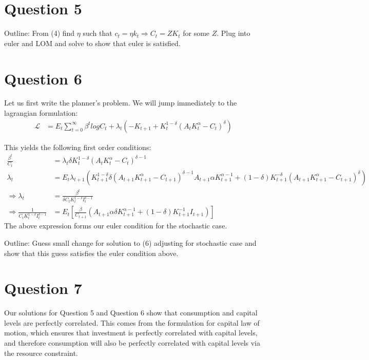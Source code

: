 \documentclass[11pt]{article} %
\begin{document}
\section{Question 5}
Outline: From (4) find $\eta$ such that $c_t = \eta k_t \Rightarrow C_t = ZK_t$ for some $Z$. Plug into euler and LOM and solve to show that euler is satisfied.
\section{Question 6}
Let us first write the planner's problem. We will jump immediately to the lagrangian formulation:
\begin{align*}
\mathcal{L} &= E_t\sum_{t=0}^{\infty} \beta^t log C_t + \lambda_t\left(-K_{t+1}+ K_t^{1-\delta}\left( A_tK_t^{\alpha}  - C_t \right)^{\delta}\right)
\end{align*}

This yields the following first order conditions:
\begin{align*}
\frac{\beta^t}{C_t} &= \lambda_t \delta K_t^{1-\delta}(A_tK_t^{\alpha}  - C_t )^{\delta - 1}\\
\lambda_t &= E_t\lambda_{t+1}(K_{t+1}^{1-\delta}\delta(A_{t+1}K_{t+1}^{\alpha}  - C_{t+1} )^{\delta - 1}A_{t+1}\alpha K_{t+1}^{\alpha - 1} + (1-\delta)K_{t+1}^{-\delta} \left( A_{t+1}K_{t+1}^{\alpha}  - C_{t+1} \right)^{\delta})\\
\Rightarrow \lambda_t &= \frac{\beta^t}{\delta C_tK_t^{1-\delta}I_t^{\delta - 1}} \\
\Rightarrow  \frac{1}{C_tK_t^{1-\delta}I_t^{\delta - 1}}  &=  E_t\left[\frac{\beta}{C_{t+1}}(A_{t+1}\alpha \delta K_{t+1}^{\alpha - 1} + (1-\delta)K_{t+1}^{-1}I_{t+1})\right]
\end{align*}
The above expression forms our euler condition for the stochastic case. 

Outline: Guess small change for solution to (6) adjusting for stochastic case and show that this guess satisfies the euler condition above.

\section{Question 7}
Our solutions for Question 5 and Question 6 show that consumption and capital levels are perfectly correlated. This comes from the formulation for capital law of motion, which ensures that investment is perfectly correlated with capital levels, and therefore consumption will also be perfectly correlated with capital levels via the resource constraint.
\end{document}
